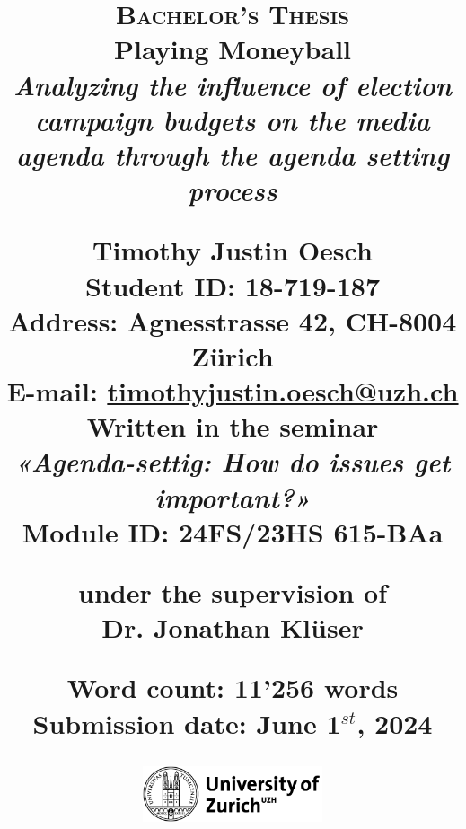 \begin{titlepage}
\title{
    \raggedright
    \small
    \textsc{Bachelor's Thesis} \\
    \vspace{0.5cm}
    \fontsize{32pt}{32pt}
    \textbf{Playing Moneyball}\\
    \vspace{0.2cm}
    \Large\textit{Analyzing the influence of election campaign budgets on the media agenda through the agenda setting process} \\
    
    \vspace{1cm}

    \textbf{Timothy Justin Oesch }\\
    \vspace{0.25cm}
    \normalsize
    \textbf{Student ID:} 18-719-187\\
    \textbf{Address:} Agnesstrasse 42, CH-8004 Zürich\\
    \textbf{E-mail:} \href{mailto:timothyjustin.oesch@uzh.ch}{\underline{timothyjustin.oesch@uzh.ch}}\\
    
    \vspace{0.5cm} 
    Written in the seminar\\
    \textit{«Agenda-settig: How do issues get important?»}\\
    Module ID: 24FS/23HS 615-BAa
    
    \vspace{0.5cm}
    under the supervision of\\
    \textbf{Dr. Jonathan Klüser}

    
    
    \vspace{0.25cm}
    \scriptsize{
        Word count: 11'256 words \\
        Submission date: June 1$^{st}$, 2024
    } \\
    
    \date{}
    \begin{figure}[b]
        \centering
        \includegraphics[width=200px]{LaTeX/partials/01.1_uzh_logo.png}
    \end{figure}
}
\clearpage\maketitle
\thispagestyle{empty}
\end{titlepage}